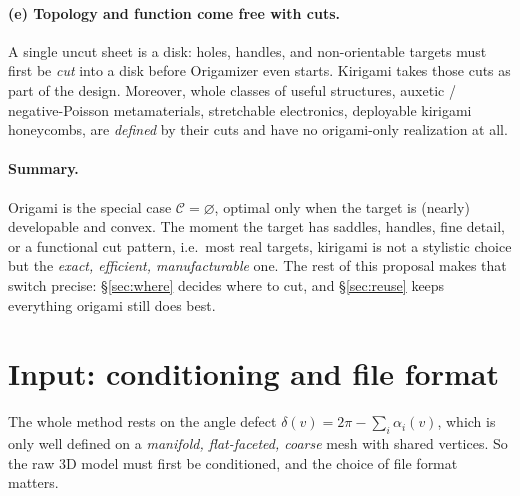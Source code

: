 \documentclass[11pt]{article}
\newcommand{\defect}{\delta}
\newcommand{\cut}{\mathcal{C}}
\begin{document}
\paragraph{(e) Topology and function come free with cuts.} A single uncut
sheet is a disk: holes, handles, and non-orientable targets must first be
\emph{cut} into a disk before Origamizer even starts. Kirigami takes those
cuts as part of the design. Moreover, whole classes of useful structures,
auxetic / negative-Poisson metamaterials, stretchable electronics,
deployable kirigami honeycombs, are \emph{defined} by their cuts and have
no origami-only realization at all.

\paragraph{Summary.} Origami is the special case $\cut=\varnothing$, optimal
only when the target is (nearly) developable and convex. The moment the
target has saddles, handles, fine detail, or a functional cut pattern,
i.e.\ most real targets, kirigami is not a stylistic choice but the
\emph{exact, efficient, manufacturable} one. The rest of this proposal makes
that switch precise: \S\ref{sec:where} decides where to cut, and
\S\ref{sec:reuse} keeps everything origami still does best.

\section{Input: conditioning and file format}\label{sec:input}
The whole method rests on the angle defect $\defect(v)=2\pi-\sum_i\alpha_i(v)$,
which is only well defined on a \emph{manifold, flat-faceted, coarse} mesh
with shared vertices. So the raw 3D model must first be conditioned, and the
choice of file format matters.
\end{document}
